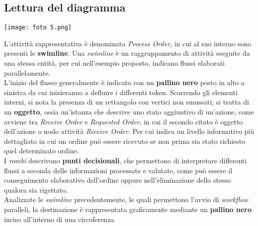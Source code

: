 \documentclass{article}
\begin{document}
\subsection*{Lettura del diagramma}
\large
\begin{center}
    \texttt{[image: foto 5.png]}
\end{center}
L'attività rappresentativa è denominata \textit{Process Order}, in cui al suo interno sono presenti le \textbf{swimline}. Una \textit{swimline} è un raggruppamento di attività eseguite da una stessa entità, per cui nell'esempio proposto, indicano flussi elaborati parallelamente.\vspace*{14pt}\\
L'inizio del flusso generalmente è indicato con un \textbf{pallino nero} posto in alto a sinistra da cui inizieranno a defluire i differenti token. Scorrendo gli elementi interni, si nota la presenza di un rettangolo con vertici non smussati; si tratta di un \textbf{oggetto}, ossia un'istanza che descrive uno stato aggiuntivo di un'azione, come avviene tra \textit{Receive Order} e \textit{Requested Order}, in cui il secondo citato è oggetto dell'azione o nodo attività \textit{Receive Order}. Per cui indica un livello informativo più dettagliato in cui un ordine può essere ricevuto se non prima sia stato richiesto quel determinato ordine.\vspace*{14pt}\\
I \textit{rombi} descrivono \textbf{punti decisionali}, che permettono di interpretare differenti flussi a seconda delle informazioni processate e valutate, come può essere il conseguimento elaborativo dell'ordine oppure nell'eliminazione dello stesso qualora sia rigettato.\vspace*{14pt}\\
Analizzate le \textit{swimline} precedentemente, le quali permettono l'avvio di \textit{workflow} paralleli, la destinazione è rappresentata graficamente mediante un \textbf{pallino nero} inciso all'interno di una circoferenza.
\end{document}
